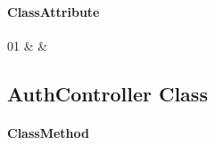 \paragraph{ClassAttribute}
\begin{ClassAttributeTable}
01 &  &  \\ \hline
\end{ClassAttributeTable}

\subsection{AuthController Class}

\paragraph{ClassMethod}
